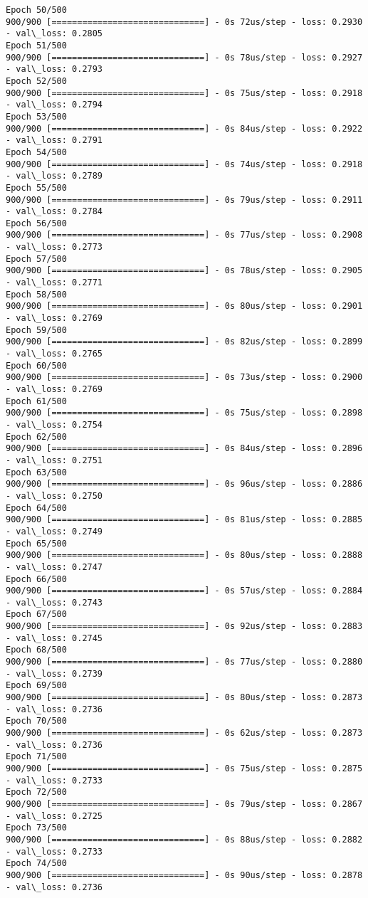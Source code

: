 \documentclass[11pt]{article}
\begin{document}
\begin{Verbatim}[commandchars=\\\{\}]
Epoch 50/500
900/900 [==============================] - 0s 72us/step - loss: 0.2930 - val\_loss: 0.2805
Epoch 51/500
900/900 [==============================] - 0s 78us/step - loss: 0.2927 - val\_loss: 0.2793
Epoch 52/500
900/900 [==============================] - 0s 75us/step - loss: 0.2918 - val\_loss: 0.2794
Epoch 53/500
900/900 [==============================] - 0s 84us/step - loss: 0.2922 - val\_loss: 0.2791
Epoch 54/500
900/900 [==============================] - 0s 74us/step - loss: 0.2918 - val\_loss: 0.2789
Epoch 55/500
900/900 [==============================] - 0s 79us/step - loss: 0.2911 - val\_loss: 0.2784
Epoch 56/500
900/900 [==============================] - 0s 77us/step - loss: 0.2908 - val\_loss: 0.2773
Epoch 57/500
900/900 [==============================] - 0s 78us/step - loss: 0.2905 - val\_loss: 0.2771
Epoch 58/500
900/900 [==============================] - 0s 80us/step - loss: 0.2901 - val\_loss: 0.2769
Epoch 59/500
900/900 [==============================] - 0s 82us/step - loss: 0.2899 - val\_loss: 0.2765
Epoch 60/500
900/900 [==============================] - 0s 73us/step - loss: 0.2900 - val\_loss: 0.2769
Epoch 61/500
900/900 [==============================] - 0s 75us/step - loss: 0.2898 - val\_loss: 0.2754
Epoch 62/500
900/900 [==============================] - 0s 84us/step - loss: 0.2896 - val\_loss: 0.2751
Epoch 63/500
900/900 [==============================] - 0s 96us/step - loss: 0.2886 - val\_loss: 0.2750
Epoch 64/500
900/900 [==============================] - 0s 81us/step - loss: 0.2885 - val\_loss: 0.2749
Epoch 65/500
900/900 [==============================] - 0s 80us/step - loss: 0.2888 - val\_loss: 0.2747
Epoch 66/500
900/900 [==============================] - 0s 57us/step - loss: 0.2884 - val\_loss: 0.2743
Epoch 67/500
900/900 [==============================] - 0s 92us/step - loss: 0.2883 - val\_loss: 0.2745
Epoch 68/500
900/900 [==============================] - 0s 77us/step - loss: 0.2880 - val\_loss: 0.2739
Epoch 69/500
900/900 [==============================] - 0s 80us/step - loss: 0.2873 - val\_loss: 0.2736
Epoch 70/500
900/900 [==============================] - 0s 62us/step - loss: 0.2873 - val\_loss: 0.2736
Epoch 71/500
900/900 [==============================] - 0s 75us/step - loss: 0.2875 - val\_loss: 0.2733
Epoch 72/500
900/900 [==============================] - 0s 79us/step - loss: 0.2867 - val\_loss: 0.2725
Epoch 73/500
900/900 [==============================] - 0s 88us/step - loss: 0.2882 - val\_loss: 0.2733
Epoch 74/500
900/900 [==============================] - 0s 90us/step - loss: 0.2878 - val\_loss: 0.2736

\end{Verbatim}
\end{document}
